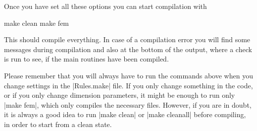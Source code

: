 Once you have set all these options you can start compilation with

\begin{code}
    make clean
    make fem
\end{code}

This should compile everything. In case of a compilation error you will
find some messages during compilation and also at the bottom of the output,
where a check is run to see, if the main routines have been compiled.

Please remember that you will always have to run the commands above
when you change settings in the |Rules.make| file. If you only change
something in the code, or if you only change dimension parameters, it
might be enough to run only |make fem|, which only compiles the necessary
files. However, if you are in doubt, it is always a good idea to run
|make clean| or |make cleanall| before compiling, in order to start from
a clean state.


